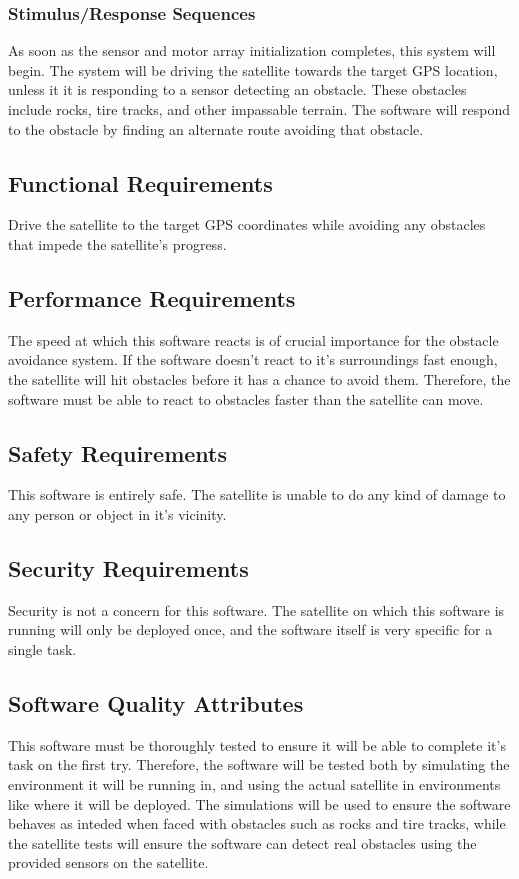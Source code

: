 \documentclass[10pt,onecolumn,draftclsnofoot,document]{IEEEtran}
\begin{document}
\subsubsection{Stimulus/Response Sequences}
As soon as the sensor and motor array initialization completes, this system will begin. The system will be driving the satellite towards the target GPS location, unless it it is responding to a sensor detecting an obstacle. These obstacles include rocks, tire tracks, and other impassable terrain. The software will respond to the obstacle by finding an alternate route avoiding that obstacle. 

\subsection{Functional Requirements}
Drive the satellite to the target GPS coordinates while avoiding any obstacles that impede the satellite's progress.

\subsection{Performance Requirements}
The speed at which this software reacts is of crucial importance for the obstacle avoidance system. If the software doesn't react to it's surroundings fast enough, the satellite will hit obstacles before it has a chance to avoid them. Therefore, the software must be able to react to obstacles faster than the satellite can move.

\subsection{Safety Requirements}
This software is entirely safe. The satellite is unable to do any kind of damage to any person or object in it's vicinity.

\subsection{Security Requirements}
Security is not a concern for this software. The satellite on which this software is running will only be deployed once, and the software itself is very specific for a single task.

\subsection{Software Quality Attributes}
This software must be thoroughly tested to ensure it will be able to complete it's task on the first try. Therefore, the software will be tested both by simulating the environment it will be running in, and using the actual satellite in environments like where it will be deployed. The simulations will be used to ensure the software behaves as inteded when faced with obstacles such as rocks and tire tracks, while the satellite tests will ensure the software can detect real obstacles using the provided sensors on the satellite.
\end{document}
